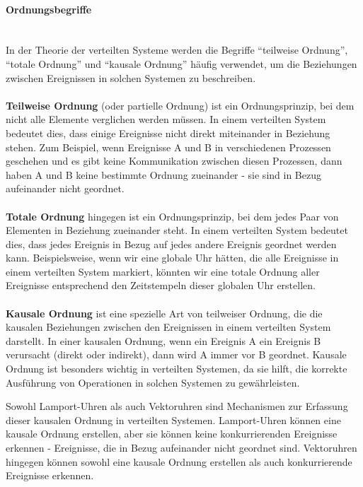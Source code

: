 \documentclass[../vs-script-first-v01.tex]{subfiles}
\begin{document}
\paragraph{Ordnungsbegriffe\\\\}
In der Theorie der verteilten Systeme werden die Begriffe \enquote{teilweise Ordnung}, \enquote{totale Ordnung} und \enquote{kausale Ordnung} häufig verwendet, um die Beziehungen zwischen Ereignissen in solchen Systemen zu beschreiben.
\\\\
\textbf{Teilweise Ordnung} (oder partielle Ordnung) ist ein Ordnungsprinzip, bei dem nicht alle Elemente verglichen werden müssen. In einem verteilten System bedeutet dies, dass einige Ereignisse nicht direkt miteinander in Beziehung stehen. Zum Beispiel, wenn Ereignisse A und B  in verschiedenen Prozessen geschehen und es gibt keine Kommunikation zwischen diesen Prozessen, dann haben A und B keine bestimmte Ordnung zueinander - sie sind in Bezug aufeinander nicht geordnet.
\\\\
\textbf{Totale Ordnung} hingegen ist ein Ordnungsprinzip, bei dem jedes Paar von Elementen in Beziehung zueinander steht. In einem verteilten System bedeutet dies, dass jedes Ereignis in Bezug auf jedes andere Ereignis geordnet werden kann. Beispielsweise, wenn wir eine globale Uhr hätten, die alle Ereignisse in einem verteilten System markiert, könnten wir eine totale Ordnung aller Ereignisse entsprechend den Zeitstempeln dieser globalen Uhr erstellen.
\\\\
\textbf{Kausale Ordnung} ist eine spezielle Art von teilweiser Ordnung, die die kausalen Beziehungen zwischen den Ereignissen in einem verteilten System darstellt. In einer kausalen Ordnung, wenn ein Ereignis A ein Ereignis B verursacht (direkt oder indirekt), dann wird A immer vor B geordnet. Kausale Ordnung ist besonders wichtig in verteilten Systemen, da sie hilft, die korrekte Ausführung von Operationen in solchen Systemen zu gewährleisten.

Sowohl Lamport-Uhren als auch Vektoruhren sind Mechanismen zur Erfassung dieser kausalen Ordnung in verteilten Systemen. Lamport-Uhren können eine kausale Ordnung erstellen, aber sie können keine konkurrierenden Ereignisse erkennen - Ereignisse, die in Bezug aufeinander nicht geordnet sind. Vektoruhren hingegen können sowohl eine kausale Ordnung erstellen als auch konkurrierende Ereignisse erkennen.
\end{document}
